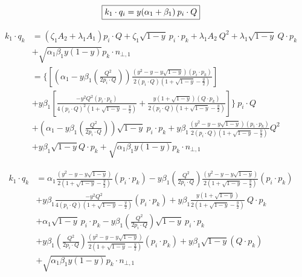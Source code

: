 \begin{equation}
	\begin{aligned}
		\fbox{$  k_1 \cdot q_i=y({\alpha_1}+\beta_1)\:p_i\cdot Q $}
    \end{aligned}
\end{equation}

\begin{equation}
	\begin{aligned}	
	k_1 \cdot q_k &= (\zeta_1 A_2 + \lambda_1 A_1)p_i \cdot Q+\zeta_1 \sqrt{1-y}\:p_i\cdot p_k + \lambda_1 A_2\:Q^2+ \lambda_1\sqrt{1-y}\:Q\cdot p_k\\
	&+\sqrt{\alpha_1\beta_1y(1-y)} p_k \cdot {n_{\bot,1}}\\	
	&=\lbrace[(\alpha_1 -y\beta_1(\frac{Q^2}{2p_i \cdot Q}))\frac{(y^2 -y-y\sqrt{1-y}) (p_{i}\cdot {p_k})}{2(p_i\cdot Q)(1+\sqrt{1-y}-\frac{y}{2})}]\\&
	+y\beta_1[\frac{-y^2 Q^2 (p_{i}\cdot {p_k})}{4(p_i\cdot Q)^2(1+\sqrt{1-y}-\frac{y}{2})}+ \frac{y(1+\sqrt{1-y})(Q \cdot {p_k})}{2(p_i\cdot Q)(1+\sqrt{1-y}-\frac{y}{2})}]\rbrace\:p_i \cdot Q\\
	&+(\alpha_1 -y\beta_1(\frac{Q^2}{2p_i \cdot Q}))\sqrt{1-y}\:p_i \cdot p_k+y\beta_1\frac{(y^2 -y-y\sqrt{1-y}) (p_{i}\cdot {p_k})}{2(p_i\cdot Q)(1+\sqrt{1-y}-\frac{y}{2})}Q^2\\
	&+y\beta_1\sqrt{1-y} Q\cdot p_k+\sqrt{\alpha_1\beta_1y(1-y)} p_k \cdot {n_{\bot,1}} 
    \end{aligned}
\end{equation}

\begin{equation}
	\begin{aligned}
	k_1 \cdot q_k &= \alpha_1 \frac{(y^2 -y-y\sqrt{1-y}) }{2(1+\sqrt{1-y}-\frac{y}{2})}(p_{i}\cdot {p_k})
	-y\beta_1(\frac{Q^2}{2p_i \cdot Q})\frac{(y^2 -y-y\sqrt{1-y})}{2(1+\sqrt{1-y}-\frac{y}{2})}(p_{i}\cdot {p_k})\\
&+y\beta_1\frac{-y^2 Q^2 }{4(p_i\cdot Q)(1+\sqrt{1-y}-\frac{y}{2})}(p_{i}\cdot {p_k})+ y\beta_1\frac{y(1+\sqrt{1-y})}{2(1+\sqrt{1-y}-\frac{y}{2})}\:Q \cdot p_k\\
	&+\alpha_1 \sqrt{1-y}\:p_i \cdot p_k-y\beta_1(\frac{Q^2}{2p_i \cdot Q})\sqrt{1-y}\:p_i \cdot p_k\\
	&+y\beta_1(\frac{Q^2}{2p_i \cdot Q})\frac{(y^2 -y-y\sqrt{1-y})}{2(1+\sqrt{1-y}-\frac{y}{2})}(p_{i}\cdot {p_k})+y\beta_1\sqrt{1-y}(Q\cdot p_k)\\
	&+\sqrt{\alpha_1\beta_1y(1-y)} p_k \cdot {n_{\bot,1}} 
    \end{aligned}
\end{equation}

